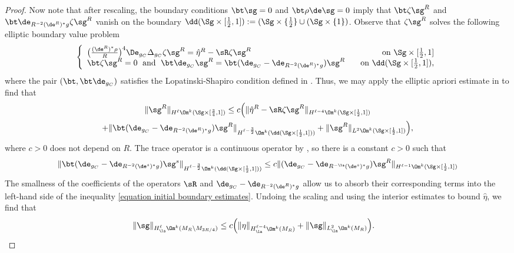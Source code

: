 \documentclass[hidelinks, 12pt, oneside, reqno]{amsart}
\begin{document}
\begin{proof}
    Now note that after rescaling, the boundary conditions $\bt \sg = 0$ and $\bt \rho \de \sg = 0$ imply that $\bt \zeta \sg^R$ and $\bt \de_{R^{-2}(\de^R)^*g} \zeta \sg^R$ vanish on the boundary $\dd (\Sg \times [\tfrac12,1]) := (\Sg \times \{\frac12\} \cup (\Sg \times \{1\})$. Observe that $\zeta \sg^R$ solves the following elliptic boundary value problem 
    \begin{equation}
        \left\{
            \begin{array}{lr}
                \big(\tfrac{(\de^R)^* \rho}{R}\big)^4\De_{g_C} \Delta_{g_C} \zeta \sg^R = \hat \eta^R - \sR \zeta \sg^R  & \;\; \text{ on } \Sg \times [\tfrac12,1]\\ 
                \bt \zeta \sg^R = 0 \;\text{ and }\; \bt \de_{g_C} \sg^R = \bt(\de_{g_C} - \de_{R^{-2}(\de^R)^*g})\sg^R & \;\; \text{ on } \dd (\Sg \times [\tfrac12,1]),
            \end{array}
        \right.
    \end{equation}
    where the pair $(\bt, \bt \de_{g_C})$ satisfies the Lopatinski-Shapiro condition defined in \cite[Definition 1.6.1]{HodgeDecompSchwarz}. Thus, we may apply the elliptic apriori estimate in \cite[(ii), Theorem 1.6.2]{HodgeDecompSchwarz} to find that
    \begin{multline}\label{equation initial boundary estimates}
        \|\sg^R\|_{H^{\ell}\Om^k(\Sg \times [\frac34,1])} \le c\Big(\|\hat \eta^R - \sR \zeta \sg^R\|_{H^{\ell-4}\Om^k(\Sg \times [\frac12,1])} \\ + \|\bt(\de_{g_C} - \de_{R^{-2}(\de^R)^*g})\sg^R\|_{H^{\ell-\frac32}\Om^k(\dd (\Sg \times [\frac12,1]))} + \|\sg^R\|_{L^2\Om^k(\Sg \times [\frac12,1])} \Big),
    \end{multline}
    where $c>0$ does not depend on $R$. The trace operator is a continuous operator by \cite[Theorem 1.3.7(c)]{HodgeDecompSchwarz}, so there is a constant $c>0$ such that
    \[
    \|\bt(\de_{g_C} - \de_{R^{-2}(\de^s)^*g})\sg^s\|_{H^{\ell-\frac32}\Om^k(\dd (\Sg \times [\frac12,1]))} \le c \|(\de_{g_C} - \de_{R^{-\la}(\de^s)^*g})\sg^R\|_{H^{\ell-1} \Om^k(\Sg \times [\frac12,1])}
    \]
    The smallness of the coefficients of the operators $\sR$ and $\de_{g_C} - \de_{R^{-2}(\de^R)^*g}$ allow us to absorb their corresponding terms into the left-hand side of the inequality \eqref{equation initial boundary estimates}. Undoing the scaling and using the interior estimates to bound $\hat \eta$, we find that
    \begin{align*}
        \|\sg\|_{H^{\ell}_{\la}\Om^k(M_{R}\setminus M_{3R/4})} & \le c\Big(\|\eta\|_{H^{\ell-4}_{\la}\Om^k(M_R)} + \|\sg\|_{L^2_{\la}\Om^k(M_R)} \Big).

\end{align*}
\end{proof}
\end{document}
